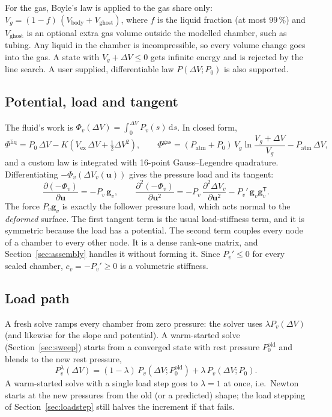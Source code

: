 \documentclass[11pt,a4paper]{article}
\newcommand{\vect}[1]{\bm{#1}}
\newcommand{\uu}{\vect{u}}
\newcommand{\g}{\vect{g}}
\newcommand{\dV}{\Delta V}
\theoremstyle{remark}
\begin{document}
For the gas, Boyle's law is applied to the gas share only:
$V_g = (1-f)\,(V_{\text{body}} + V_{\text{ghost}})$, where $f$ is the liquid fraction (at most
$99\,\%$) and $V_{\text{ghost}}$ is an optional extra gas volume outside the modelled chamber, such
as tubing. Any liquid in the chamber is incompressible, so every volume change goes into the gas.
A state with $V_g+\dV\le 0$ gets infinite energy and is rejected by the line search. A user
supplied, differentiable law $P(\dV; P_0)$ is also supported.

\subsection{Potential, load and tangent}

The fluid's work is $\Phi_v(\dV) = \int_0^{\dV} P_v(s)\,\mathrm{d}s$. In closed form,
\begin{equation}
\Phi^{\text{liq}} = P_0\,\dV - K\left(V_{\text{ex}}\,\dV + \tfrac12\dV^2\right),\qquad
\Phi^{\text{gas}} = (P_{\text{atm}}+P_0)\,V_g\ln\frac{V_g+\dV}{V_g} - P_{\text{atm}}\,\dV,
\end{equation}
and a custom law is integrated with 16-point Gauss--Legendre quadrature. Differentiating
$-\Phi_v(\dV_v(\uu))$ gives the pressure load and its tangent:
\begin{equation}\label{eq:pressuretangent}
\frac{\partial(-\Phi_v)}{\partial\uu} = -P_v\,\g_v,\qquad
\frac{\partial^2(-\Phi_v)}{\partial\uu^2} = -P_v\,\frac{\partial^2\dV_v}{\partial\uu^2} - P_v'\,\g_v\g_v^{\mathsf T}.
\end{equation}
The force $P_v\g_v$ is exactly the follower pressure load, which acts normal to the \emph{deformed}
surface. The first tangent term is the usual load-stiffness term, and it is symmetric because
the load has a potential. The second term couples every node of a chamber to every other node. It
is a dense rank-one matrix, and Section~\ref{sec:assembly} handles it without forming it. Since
$P_v'\le0$ for every sealed chamber, $c_v = -P_v' \ge 0$ is a volumetric stiffness.

\subsection{Load path}

A fresh solve ramps every chamber from zero pressure: the solver uses $\lambda P_v(\dV)$ (and
likewise for the slope and potential). A warm-started solve (Section~\ref{sec:sweep}) starts from
a converged state with rest pressure $P_0^{\text{old}}$ and blends to the new rest pressure,
\begin{equation}
P_v^{\lambda}(\dV) = (1-\lambda)\,P_v(\dV; P_0^{\text{old}}) + \lambda\,P_v(\dV; P_0).
\end{equation}
A warm-started solve with a single load step goes to $\lambda=1$ at once, i.e.\ Newton starts at the
new pressures from the old (or a predicted) shape; the load stepping of Section~\ref{sec:loadstep}
still halves the increment if that fails.
\end{document}
